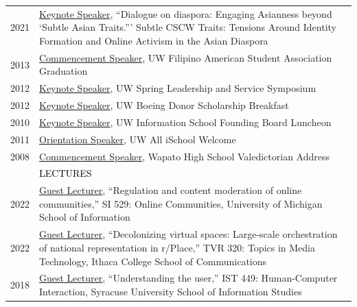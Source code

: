 \documentclass[12pt]{article}
\begin{document}
{\begin{longtable}{R{0.75in}p{5.0in}}
\footnotesize{2021} & \href{https://bit.ly/subtlecscwtraits}{Keynote Speaker}, ``Dialogue on diaspora: Engaging Asianness beyond ‘Subtle Asian Traits.''' Subtle CSCW Traits: Tensions Around Identity Formation and Online Activism in the Asian Diaspora\\

\footnotesize{2013} & \href{https://youtu.be/uz1tukrR-7E}{Commencement Speaker}, UW Filipino American Student Association Graduation \\

\footnotesize{2012} & \href{https://youtu.be/WMPhe6H7yiM}{Keynote Speaker}, UW Spring Leadership and Service Symposium\\

\footnotesize{2012} & \href{https://ischool.uw.edu/news/2016/12/bryan-dosono-informatics-student-speaks-boeing-scholarship-breakfast}{Keynote Speaker}, UW Boeing Donor Scholarship Breakfast\\

\footnotesize{2010} & \href{https://ischool.uw.edu/about/leadership/founding-board}{Keynote Speaker}, UW Information School Founding Board Luncheon\\

\footnotesize{2011} & \href{https://youtu.be/5d2X0lZ9qwY}{Orientation Speaker}, UW All iSchool Welcome\\

\footnotesize{2008} & \href{https://youtu.be/5gt7nFRgkac}{Commencement Speaker}, Wapato High School Valedictorian Address \medskip \\

& \large \textcolor{black}{\uppercase{Lectures}}\\

\footnotesize{2022} & 
\href{https://docs.google.com/document/d/1zYOJm0msLRDsRf0cy98hJG2_zvaByd_6jiJ_JYdQWVs/edit}{Guest Lecturer}, ``Regulation and content moderation of online communities,'' SI 529: Online Communities, University of Michigan School of Information\\

\footnotesize{2022} & 
\href{https://drive.google.com/file/d/1284s_zvbBLQtUmoBzizW42yNGqyAllCt/view?usp=sharing}{Guest Lecturer}, ``Decolonizing virtual spaces: Large-scale orchestration of national representation in r/Place,'' TVR 320: Topics in Media Technology, Ithaca College School of Communications\\

\footnotesize{2018} & 
\href{https://bit.ly/IST449}{Guest Lecturer}, ``Understanding the user,'' IST 449: Human-Computer Interaction, Syracuse University School of Information Studies\\


\end{longtable}}
\end{document}
